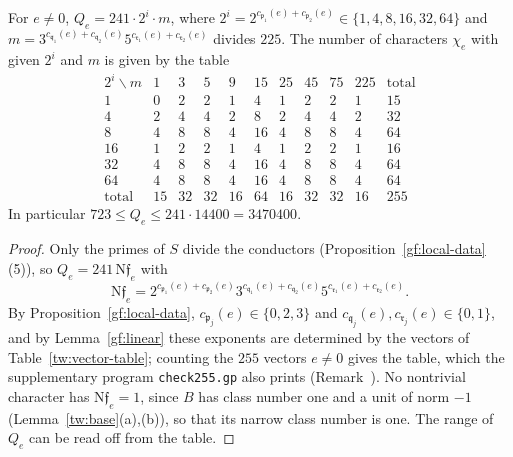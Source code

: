 \begin{corollary}\label{gf:conductors}
For $e\ne0$, $Q_e=241\cdot2^i\cdot m$, where
$2^i=2^{c_{\mathfrak p_1}(e)+c_{\mathfrak p_2}(e)}\in\{1,4,8,16,32,64\}$ and
$m=3^{c_{\mathfrak q_1}(e)+c_{\mathfrak q_2}(e)}5^{c_{\mathfrak r_1}(e)+c_{\mathfrak r_2}(e)}$
divides $225$. The number of characters $\chi_e$ with given $2^i$ and $m$ is
given by the table
\begin{equation}\label{gf:conductor-table}
\begin{array}{c|ccccccccc|c}
 2^i\backslash m&1&3&5&9&15&25&45&75&225&\text{total}\\\hline
 1&0&2&2&1&4&1&2&2&1&15\\
 4&2&4&4&2&8&2&4&4&2&32\\
 8&4&8&8&4&16&4&8&8&4&64\\
 16&1&2&2&1&4&1&2&2&1&16\\
 32&4&8&8&4&16&4&8&8&4&64\\
 64&4&8&8&4&16&4&8&8&4&64\\\hline
 \text{total}&15&32&32&16&64&16&32&32&16&255
\end{array}
\end{equation}
In particular $723\le Q_e\le241\cdot14400=3470400$.
\end{corollary}

\begin{proof}
Only the primes of $S$ divide the conductors
(Proposition~\ref{gf:local-data}(5)), so $Q_e=241\,\mathrm N\mathfrak f_e$
with
\[
 \mathrm N\mathfrak f_e=2^{c_{\mathfrak p_1}(e)+c_{\mathfrak
 p_2}(e)}3^{c_{\mathfrak q_1}(e)+c_{\mathfrak q_2}(e)}5^{c_{\mathfrak
 r_1}(e)+c_{\mathfrak r_2}(e)}.
\]
By Proposition~\ref{gf:local-data},
$c_{\mathfrak p_j}(e)\in\{0,2,3\}$ and
$c_{\mathfrak q_j}(e),c_{\mathfrak r_j}(e)\in\{0,1\}$, and by
Lemma~\ref{gf:linear} these exponents are determined by the vectors of
Table~\ref{tw:vector-table}; counting the $255$ vectors $e\ne0$ gives the
table, which the supplementary program \texttt{check255.gp} also prints
(Remark~). No nontrivial character has $\mathrm N\mathfrak f_e=1$,
since $B$ has class number one and a unit of norm $-1$
(Lemma~\ref{tw:base}(a),(b)), so that its narrow class number is one. The
range of $Q_e$ can be read off from the table.
\end{proof}

